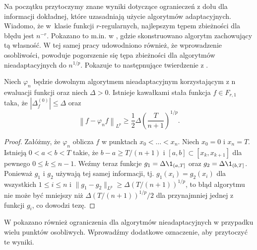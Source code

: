 \documentclass[oik, pdftex, robocza, man]{mgrwms}
\begin{document}
    Na początku przytoczymy znane wyniki dotyczące ogranieczeń z dołu dla informacji dokładnej, które uzasadniają użycie algorytmów adaptacyjnych. Wiadomo, że w~klasie funkcji $r$-regularnych, najlepszym tępem zbieżności dla błędu jest $n^{-r}$. Pokazano to m.in. w \cite{PoA}, gdzie skonstruowano algorytm zachowujący tą własność. W tej samej pracy udowodniono również, że wprowadzenie osobliwości, powoduje pogorszenie się tępa zbieżności dla algorytmów nieadaptacyjnych do $n^{1/p}$. Pokazuje to następnujące twierdzenie z \cite{PoA}.

    \begin{thm}
        Niech $\varphi_{n}$ będzie dowolnym algorytmem nieadaptacyjnym korzystającym z n ewaluacji funkcji oraz niech $\Delta > 0$. Istnieje kawałkami stała funkcja $f \in F_{r, 1}$ taka, że $|\Delta_{f}^{(0)}| \leq \Delta$ oraz
        \begin{equation*}
            \left\| f - \varphi_{n}f \right\|_{L^{p}} \geq \frac{1}{2}\Delta \left( \frac{T}{n+1} \right)^{1/p}.
        \end{equation*}
    \end{thm}
    \begin{proof}
        Załóżmy, że $\varphi_{n}$ oblicza $f$ w punktach $x_{0} < \ldots < x_{n}$. Niech $x_{0} = 0$ i $x_{n} = T$. Istnieją $0 < a < b < T$ takie, że $b-a \geq T/(n+1)$ i $[a,b] \subset [x_{k}, x_{k+1}]$ dla pewnego $0 \leq k \leq n-1$. Weźmy teraz funkcje $g_{1} = \Delta\1_{(a, T]}$ oraz $g_{2} = \Delta\1_{(b, T]}$. Ponieważ $g_{1}$ i $g_{2}$ używają tej samej informacji, tj. $g_{1}(x_{i}) = g_{2}(x_{i})$ dla wszystkich $1 \leq i \leq n$ i $\| g_{1} - g_{2} \|_{L^{p}} \geq \Delta(T / (n+1))^{1/p}$, to błąd algorytmu nie może być mniejszy niż $\Delta(T/(n+1))^{1/p} / 2$ dla przynajmniej jednej z funkcji $g_{i}$, co dowodzi tezę.
    \end{proof}

    W \cite{PoA} pokazano również ograniczenia dla algorytmów nieadaptacyjnych w przypadku wielu punktów osobliwych. Wprowadźmy dodatkowe oznaczenie, aby przytoczyć te wyniki.
    
\end{document}
